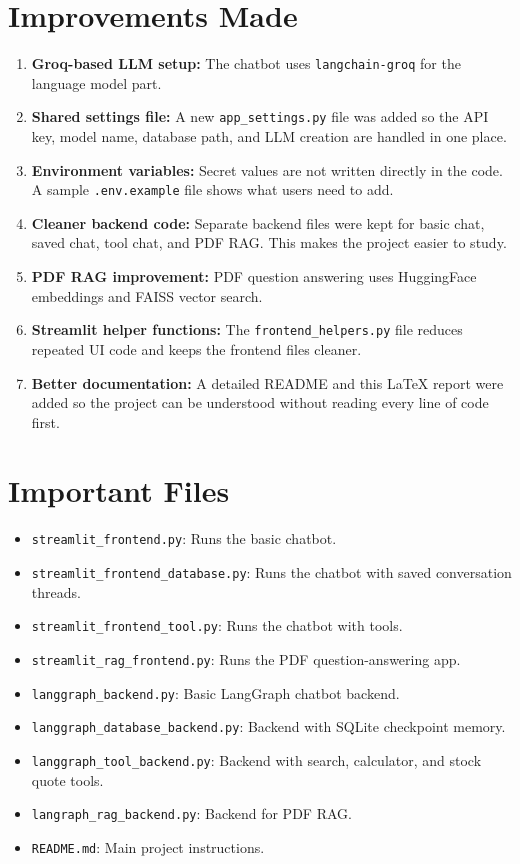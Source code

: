 \documentclass[12pt]{article}
\begin{document}
\section{Improvements Made}
\begin{enumerate}[leftmargin=*]
    \item \textbf{Groq-based LLM setup:} The chatbot uses \texttt{langchain-groq} for the language model part.
    \item \textbf{Shared settings file:} A new \texttt{app\_settings.py} file was added so the API key, model name, database path, and LLM creation are handled in one place.
    \item \textbf{Environment variables:} Secret values are not written directly in the code. A sample \texttt{.env.example} file shows what users need to add.
    \item \textbf{Cleaner backend code:} Separate backend files were kept for basic chat, saved chat, tool chat, and PDF RAG. This makes the project easier to study.
    \item \textbf{PDF RAG improvement:} PDF question answering uses HuggingFace embeddings and FAISS vector search.
    \item \textbf{Streamlit helper functions:} The \texttt{frontend\_helpers.py} file reduces repeated UI code and keeps the frontend files cleaner.
    \item \textbf{Better documentation:} A detailed README and this LaTeX report were added so the project can be understood without reading every line of code first.
\end{enumerate}

\section{Important Files}
\begin{itemize}[leftmargin=*]
    \item \texttt{streamlit\_frontend.py}: Runs the basic chatbot.
    \item \texttt{streamlit\_frontend\_database.py}: Runs the chatbot with saved conversation threads.
    \item \texttt{streamlit\_frontend\_tool.py}: Runs the chatbot with tools.
    \item \texttt{streamlit\_rag\_frontend.py}: Runs the PDF question-answering app.
    \item \texttt{langgraph\_backend.py}: Basic LangGraph chatbot backend.
    \item \texttt{langgraph\_database\_backend.py}: Backend with SQLite checkpoint memory.
    \item \texttt{langgraph\_tool\_backend.py}: Backend with search, calculator, and stock quote tools.
    \item \texttt{langraph\_rag\_backend.py}: Backend for PDF RAG.
    \item \texttt{README.md}: Main project instructions.
\end{itemize}
\end{document}
